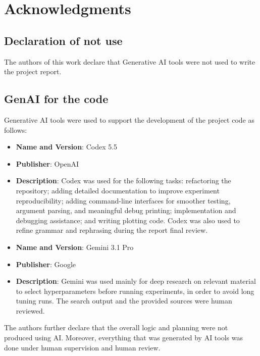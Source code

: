 \section{Acknowledgments}
\subsection{Declaration of not use}
The authors of this work declare that Generative AI tools were not used to write the project report.
\subsection{GenAI for the code}
Generative AI tools were used to support the development of the project code as follows:
\begin{itemize}
    \item \textbf{Name and Version}: Codex 5.5
    \item \textbf{Publisher}: OpenAI
    \item \textbf{Description}: Codex was used for the following tasks:
refactoring the repository; adding detailed documentation to improve experiment reproducibility;
adding command-line interfaces for smoother testing, argument parsing, and meaningful debug printing; implementation and debugging assistance;
and writing plotting code.
Codex was also used to refine grammar and rephrasing during the report final review.
    \item \textbf{Name and Version}: Gemini 3.1 Pro
    \item \textbf{Publisher}: Google
    \item \textbf{Description}: Gemini was used mainly for deep research on relevant material to select hyperparameters before running experiments, in order to avoid long tuning runs.
    The search output and the provided sources were human reviewed. 
\end{itemize}
The authors further declare that the overall logic and planning were not produced using AI. 
Moreover, everything that was generated by AI tools was done under human supervision and human review.